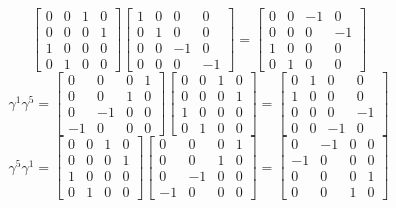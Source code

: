 \documentclass{article}
\begin{document}
\begin{flushleft}
$$\begin{bmatrix}
0 & 0 & 1 & 0 \\
0 & 0 & 0 & 1 \\
1 & 0 & 0 & 0 \\
0 & 1 & 0 & 0
\end{bmatrix}\begin{bmatrix}
1 & 0 & 0 & 0 \\
0 & 1 & 0 & 0 \\
0 & 0 & -1 & 0 \\
0 & 0 & 0 & -1
\end{bmatrix}=\begin{bmatrix}
0 & 0 & -1 & 0 \\
0 & 0 & 0 & -1 \\
1 & 0 & 0 & 0 \\
0 & 1 & 0 & 0
\end{bmatrix}
$$
$$
\gamma^{1} \gamma^{5}=\begin{bmatrix}
0 & 0 & 0 & 1 \\
0 & 0 & 1 & 0 \\
0 & -1 & 0 & 0 \\
-1 & 0 & 0 & 0
\end{bmatrix}\begin{bmatrix}
0 & 0 & 1 & 0 \\
0 & 0 & 0 & 1 \\
1 & 0 & 0 & 0 \\
0 & 1 & 0 & 0
\end{bmatrix}=\begin{bmatrix}
0 & 1 & 0 & 0 \\
1 & 0 & 0 & 0 \\
0 & 0 & 0 & -1 \\
0 & 0 & -1 & 0
\end{bmatrix}
$$
$$
\gamma^{5} \gamma^{1}=\begin{bmatrix}
0 & 0 & 1 & 0 \\
0 & 0 & 0 & 1 \\
1 & 0 & 0 & 0 \\
0 & 1 & 0 & 0
\end{bmatrix}\begin{bmatrix}
0 & 0 & 0 & 1 \\
0 & 0 & 1 & 0 \\
0 & -1 & 0 & 0 \\
-1 & 0 & 0 & 0
\end{bmatrix}=\begin{bmatrix}
0 & -1 & 0 & 0 \\
-1 & 0 & 0 & 0 \\
0 & 0 & 0 & 1 \\
0 & 0 & 1 & 0

\end{bmatrix}$$
\end{flushleft}
\end{document}
